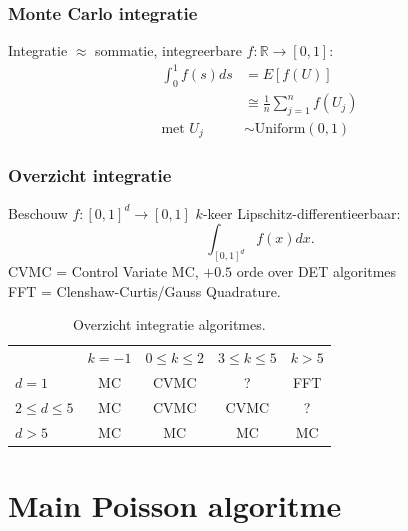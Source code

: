 \documentclass[18pt,aspectratio=149]{beamer}
\begin{document}
\begin{frame}
    \frametitle{Monte Carlo integratie}
    Integratie $\approx$ sommatie, integreerbare $f: \mathbb{R} \rightarrow [0,1]$:
    \begin{align}
        \int_{0}^{1} f(s) ds & = E[f(U)]                                 \\
                             & \cong \frac{1}{n} \sum_{j=1}^{n} f(U_{j}) \\
        \text{met } U_{j}    & \sim \text{Uniform}(0,1)
    \end{align}
\end{frame}

\begin{frame}
    \frametitle{Overzicht integratie}
    Beschouw $f:[0,1]^d \rightarrow [0,1]$ $k$-keer Lipschitz-differentieerbaar:
    \begin{equation}
        \int_{[0,1]^d} f(x) dx  .
    \end{equation}
    \pause
    CVMC = Control Variate MC, $+0.5$ orde over DET algoritmes \\
    FFT = Clenshaw-Curtis/Gauss Quadrature.
    \pause
    \begin{table}
        \centering
        \begin{tabular}{lcccc}
                            & $k=-1$ & $0 \le k \le 2$ & $3 \le k \le 5$ & $k>5$ \\
            $d=1$           & MC     & CVMC            & ?               & FFT   \\
            $2 \le d \le 5$ & MC     & CVMC            & CVMC            & ?     \\
            $d>5$           & MC     & MC              & MC              & MC    \\
        \end{tabular}
        \caption{Overzicht integratie algoritmes.}
    \end{table}
\end{frame}

\section{Main Poisson algoritme}

\begin{frame}
    \tableofcontentscurrent
\end{frame}
\end{document}
